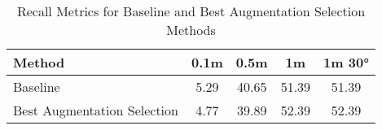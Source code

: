 
\begin{table}[ht]
    \centering
    \begin{tabular}{lcccc}
        \hline
        \textbf{Method} & \textbf{0.1m} & \textbf{0.5m} & \textbf{1m} & \textbf{1m 30°} \\
        \hline

    Baseline & 5.29 & 40.65 & 51.39 & 51.39 \\
    Best Augmentation Selection & 4.77 & 39.89 & 52.39 & 52.39 \\
        \hline
    \end{tabular}
    \caption{Recall Metrics for Baseline and Best Augmentation Selection Methods}
    \label{tab:recall_metrics}
\end{table}
